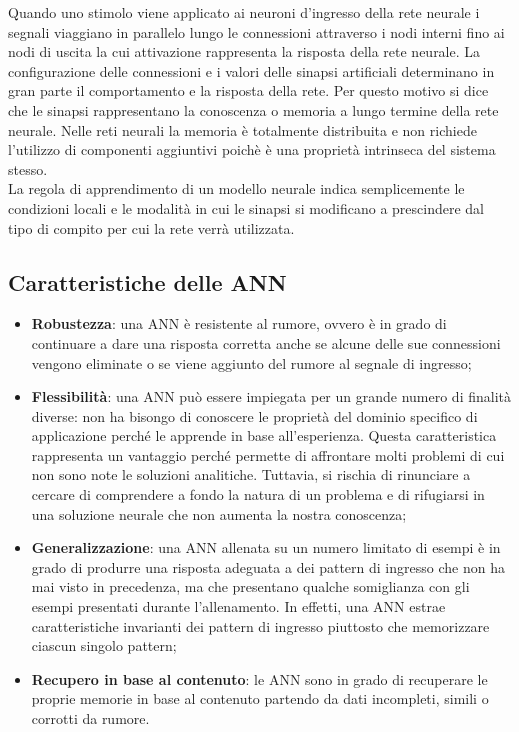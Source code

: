 Quando uno stimolo viene applicato ai neuroni d'ingresso della rete neurale i
segnali viaggiano in parallelo lungo le connessioni attraverso i nodi interni
fino ai nodi di uscita la cui attivazione rappresenta la risposta della rete
neurale.
La configurazione delle connessioni e i valori delle sinapsi artificiali
determinano in gran parte il comportamento e la risposta della rete. Per questo
motivo si dice che le sinapsi rappresentano la conoscenza o memoria a lungo
termine della rete neurale. Nelle reti neurali la memoria è totalmente
distribuita e non richiede l'utilizzo di componenti aggiuntivi poichè è una
proprietà intrinseca del sistema stesso.\\
La regola di apprendimento di un modello neurale indica semplicemente le
condizioni locali e le modalità in cui le sinapsi si modificano a prescindere
dal tipo di compito per cui la rete verrà utilizzata.

\subsection{Caratteristiche delle ANN}

\begin{itemize}
	\item \textbf{Robustezza}: una ANN è resistente al rumore, ovvero è in grado
	      di continuare a dare una risposta corretta anche se alcune delle sue
	      connessioni vengono eliminate o se viene aggiunto del rumore al
	      segnale di ingresso;

	\item \textbf{Flessibilità}: una ANN può essere impiegata per un grande
	      numero di finalità diverse: non ha bisongo di conoscere le proprietà
	      del dominio specifico di applicazione perché le apprende in base
	      all'esperienza. Questa caratteristica rappresenta un vantaggio perché
	      permette di affrontare molti problemi di cui non sono note le
	      soluzioni analitiche. Tuttavia, si rischia di rinunciare a cercare di
	      comprendere a fondo la natura di un problema e di rifugiarsi in una
	      soluzione neurale che non aumenta la nostra conoscenza;

	\item \textbf{Generalizzazione}: una ANN allenata su un numero limitato di
	      esempi è in grado di produrre una risposta adeguata a dei pattern di
	      ingresso che non ha mai visto in precedenza, ma che presentano qualche
	      somiglianza con gli esempi presentati durante l'allenamento. In
	      effetti, una ANN estrae caratteristiche invarianti dei pattern di
	      ingresso piuttosto che memorizzare ciascun singolo pattern;

	\item \textbf{Recupero in base al contenuto}: le ANN sono in grado di
	      recuperare le proprie memorie in base al contenuto partendo da dati
	      incompleti, simili o corrotti da rumore.
\end{itemize}
